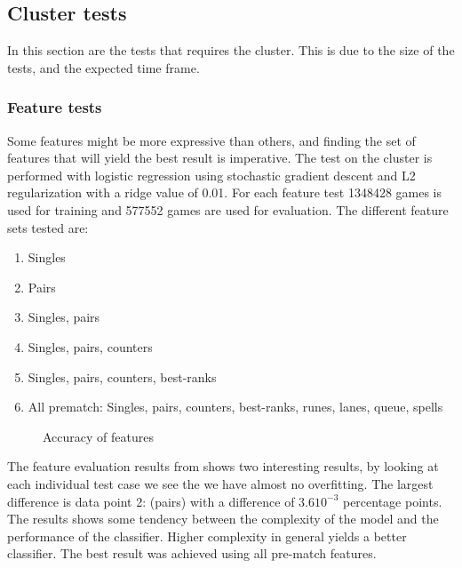 \subsection{Cluster tests}\label{sec:clustertest}
In this section are the tests that requires the cluster. This is due to the size of the tests, and the expected time frame.
\subsubsection{Feature tests}\label{sec:feattest}
Some features might be more expressive than others, and finding the set of features that will yield the best result is imperative. The test on the cluster is performed with logistic regression using stochastic gradient descent and L2 regularization with a ridge value of 0.01. 
For each feature test 1348428 games is used for training and 577552 games are used for evaluation. 
The different feature sets tested are:
\begin{enumerate}
\item Singles
\item Pairs
\item Singles, pairs
\item Singles, pairs, counters
\item Singles, pairs, counters, best-ranks
\item All prematch: Singles, pairs, counters, best-ranks, runes, lanes, queue, spells
\end{enumerate}


\begin{figure}[!htb]
  \centering
   \caption{Accuracy of features}\label{fig:cluster-feat}
\end{figure}

The feature evaluation results from  shows two interesting results, by looking at each individual test case we see the we have almost no overfitting. The largest difference is data point 2: (pairs) with a difference of $3.610^{-3}$ percentage points. The results shows some tendency between the complexity of the model and the performance of the classifier. Higher complexity in general yields a better classifier. The best result was achieved using all pre-match features.





